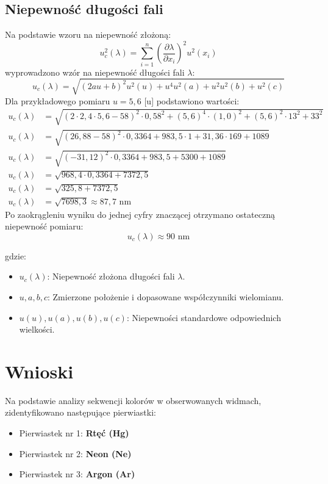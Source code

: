 \documentclass[a4paper,12pt]{article}
\begin{document}
\subsection{Niepewność długości fali}
Na podstawie wzoru na niepewność złożoną:
$$
    u_c^2(\lambda) = \sum_{i=1}^{n} \left(\frac{\partial \lambda}{\partial x_i}\right)^2 u^2(x_i)
$$
wyprowadzono wzór na niepewność długości fali $\lambda$:
$$
    u_c(\lambda) = \sqrt{ (2au + b)^2 u^2(u) + u^4 u^2(a) + u^2 u^2(b) + u^2(c) }
$$
Dla przykładowego pomiaru $u = 5{,}6$ [u] podstawiono wartości:
\begin{align*}
    u_c(\lambda) & = \sqrt{ (2 \cdot 2{,}4 \cdot 5{,}6 - 58)^2 \cdot 0{,}58^2 + (5{,}6)^4 \cdot (1{,}0)^2 + (5{,}6)^2 \cdot 13^2 + 33^2 } \\
    u_c(\lambda) & = \sqrt{ (26{,}88 - 58)^2 \cdot 0{,}3364 + 983{,}5 \cdot 1 + 31{,}36 \cdot 169 + 1089 }                                \\
    u_c(\lambda) & = \sqrt{ (-31{,}12)^2 \cdot 0{,}3364 + 983{,}5 + 5300 + 1089 }                                                         \\
    u_c(\lambda) & = \sqrt{ 968{,}4 \cdot 0{,}3364 + 7372{,}5 }                                                                           \\
    u_c(\lambda) & = \sqrt{ 325{,}8 + 7372{,}5 }                                                                                          \\
    u_c(\lambda) & = \sqrt{ 7698{,}3 } \approx 87{,}7 \text{ nm}
\end{align*}
Po zaokrągleniu wyniku do jednej cyfry znaczącej otrzymano ostateczną niepewność pomiaru:
$$
    u_c(\lambda) \approx 90 \text{ nm}
$$

gdzie:
\begin{itemize}
    \item $u_c(\lambda)$: Niepewność złożona długości fali $\lambda$.
    \item $u, a, b, c$: Zmierzone położenie i dopasowane współczynniki wielomianu.
    \item $u(u), u(a), u(b), u(c)$: Niepewności standardowe odpowiednich wielkości.
\end{itemize}
\section{Wnioski}

Na podstawie analizy sekwencji kolorów w obserwowanych widmach, zidentyfikowano następujące pierwiastki:
\begin{itemize}
    \item Pierwiastek nr 1: \textbf{Rtęć (Hg)}
    \item Pierwiastek nr 2: \textbf{Neon (Ne)}
    \item Pierwiastek nr 3: \textbf{Argon (Ar)}
\end{itemize}
\end{document}
